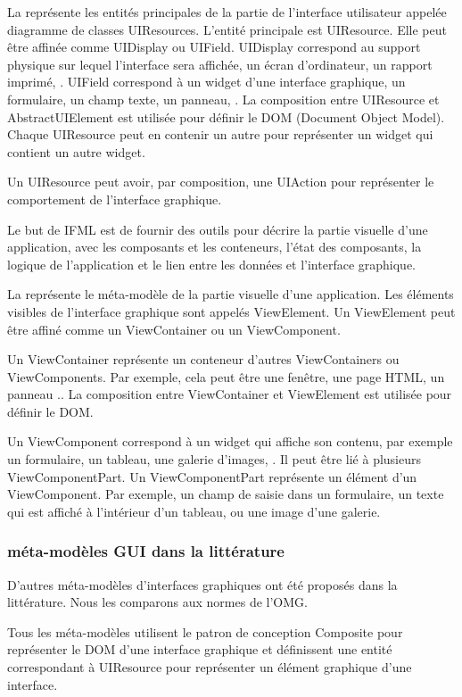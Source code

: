 \documentclass[a4paper]{article}
\begin{document}
La  représente les entités principales de la partie de l'interface utilisateur appelée diagramme de classes UIResources.
L'entité principale est UIResource.
Elle peut être affinée comme UIDisplay ou UIField.
UIDisplay correspond au support physique sur lequel l'interface sera affichée, \eg un écran d'ordinateur, un rapport imprimé, \etc.
UIField correspond à un widget d'une interface graphique, \eg un formulaire, un champ texte, un panneau, \etc.
La composition entre UIResource et AbstractUIElement est utilisée pour définir le DOM (Document Object Model).
Chaque UIResource peut en contenir un autre pour représenter un widget qui contient un autre widget.

Un UIResource peut avoir, par composition, une UIAction pour représenter le comportement de l'interface graphique.

Le but de IFML \citep{Bram14a} est de fournir des outils pour décrire la partie visuelle d'une application,
  avec les composants et les conteneurs, l'état des composants,
  la logique de l'application et le lien entre les données et l'interface graphique.


La  représente le méta-modèle de la partie visuelle d'une application.
Les éléments visibles de l'interface graphique sont appelés ViewElement.
Un ViewElement peut être affiné comme un ViewContainer ou un ViewComponent. 

Un ViewContainer représente un conteneur d'autres ViewContainers ou ViewComponents.
Par exemple, cela peut être une fenêtre, une page HTML, un panneau \etc..
La composition entre ViewContainer et ViewElement est utilisée pour définir le DOM.

Un ViewComponent correspond à un widget qui affiche son contenu, par exemple un formulaire, un tableau, une galerie d'images, \etc.
Il peut être lié à plusieurs ViewComponentPart.
Un ViewComponentPart représente un élément d'un ViewComponent.
Par exemple,
  un champ de saisie dans un formulaire,
  un texte qui est affiché à l'intérieur d'un tableau,
  ou une image d'une galerie.

\subsubsection{méta-modèles GUI dans la littérature}
\label{sec:stateMetaUI}

D'autres méta-modèles d'interfaces graphiques ont été proposés dans la littérature.
Nous les comparons aux normes de l'OMG.

Tous les méta-modèles utilisent le patron de conception Composite pour représenter le DOM d'une interface graphique et
  définissent une entité correspondant à UIResource pour représenter un élément graphique d'une interface.
\end{document}
